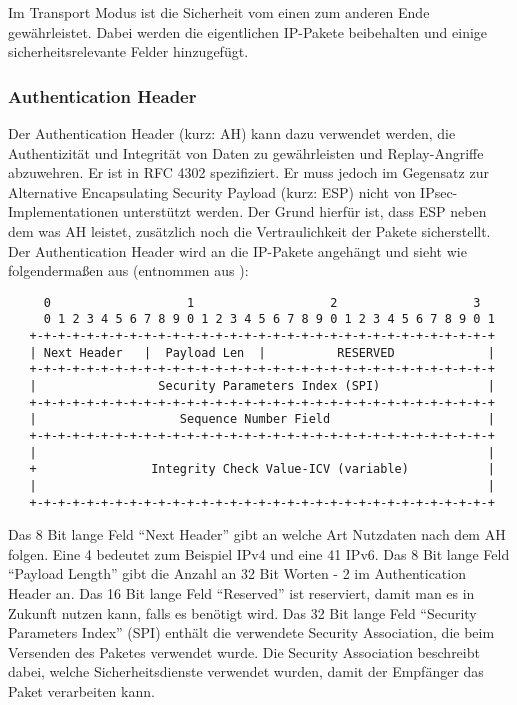 \documentclass[12pt]{scrartcl}
\begin{document}
Im Transport Modus ist die Sicherheit vom einen zum anderen Ende gewährleistet. Dabei werden die eigentlichen IP-Pakete beibehalten und einige sicherheitsrelevante Felder hinzugefügt.

\subsubsection{Authentication Header}
Der Authentication Header (kurz: AH) kann dazu verwendet werden, die Authentizität und Integrität von Daten zu gewährleisten und Replay-Angriffe abzuwehren. Er ist in RFC 4302 spezifiziert.\cite{RFC4302} Er muss jedoch im Gegensatz zur Alternative Encapsulating Security Payload (kurz: ESP) nicht von IPsec-Implementationen unterstützt werden.\cite{RFC4301} Der Grund hierfür ist, dass ESP neben dem was AH leistet, zusätzlich noch die Vertraulichkeit der Pakete sicherstellt. Der Authentication Header wird an die IP-Pakete angehängt und sieht wie folgendermaßen aus (entnommen aus \cite{RFC4302}):

\begin{addmargin}[-2em]{0em}
\begin{verbatim}
     0                   1                   2                   3
     0 1 2 3 4 5 6 7 8 9 0 1 2 3 4 5 6 7 8 9 0 1 2 3 4 5 6 7 8 9 0 1
   +-+-+-+-+-+-+-+-+-+-+-+-+-+-+-+-+-+-+-+-+-+-+-+-+-+-+-+-+-+-+-+-+
   | Next Header   |  Payload Len  |          RESERVED             |
   +-+-+-+-+-+-+-+-+-+-+-+-+-+-+-+-+-+-+-+-+-+-+-+-+-+-+-+-+-+-+-+-+
   |                 Security Parameters Index (SPI)               |
   +-+-+-+-+-+-+-+-+-+-+-+-+-+-+-+-+-+-+-+-+-+-+-+-+-+-+-+-+-+-+-+-+
   |                    Sequence Number Field                      |
   +-+-+-+-+-+-+-+-+-+-+-+-+-+-+-+-+-+-+-+-+-+-+-+-+-+-+-+-+-+-+-+-+
   |                                                               |
   +                Integrity Check Value-ICV (variable)           |
   |                                                               |
   +-+-+-+-+-+-+-+-+-+-+-+-+-+-+-+-+-+-+-+-+-+-+-+-+-+-+-+-+-+-+-+-+
  \end{verbatim}
\end{addmargin}
Das 8 Bit lange Feld "`Next Header"' gibt an welche Art Nutzdaten nach dem AH folgen. Eine 4 bedeutet zum Beispiel IPv4 und eine 41 IPv6. Das 8 Bit lange Feld "`Payload Length"' gibt die Anzahl an 32 Bit Worten - 2 im Authentication Header an. Das 16 Bit lange Feld "`Reserved"' ist reserviert, damit man es in Zukunft nutzen kann, falls es benötigt wird. Das 32 Bit lange Feld "`Security Parameters Index"' (SPI) enthält die verwendete Security Association, die beim Versenden des Paketes verwendet wurde. Die Security Association beschreibt dabei, welche Sicherheitsdienste verwendet wurden, damit der Empfänger das Paket verarbeiten kann. 
\end{document}
